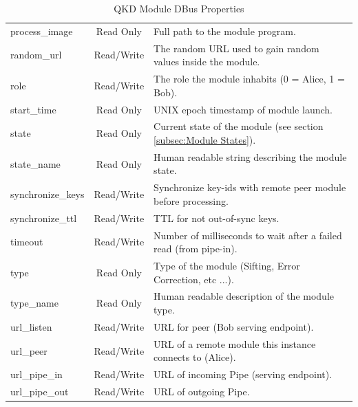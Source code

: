 \begin{table}[h!]
\begin{tabular}{lcp{8cm}}
    process\_image              &   Read Only           &   Full path to the module program.\\
    random\_url                 &   Read/Write          &   The random URL used to gain random values inside the module.\\
    role                        &   Read/Write          &   The role the module inhabits (0 = Alice, 1 = Bob).\\
    start\_time                 &   Read Only           &   UNIX epoch timestamp of module launch.\\
    state                       &   Read Only           &   Current state of the module (see section \ref{subsec:Module States}).\\
    state\_name                 &   Read Only           &   Human readable string describing the module state.\\
    synchronize\_keys           &   Read/Write          &   Synchronize key-ids with remote peer module before processing.\\
    synchronize\_ttl            &   Read/Write          &   TTL for not out-of-sync keys.\\
    timeout                     &   Read/Write          &   Number of milliseconds to wait after a failed read (from pipe-in).\\
    type                        &   Read Only           &   Type of the module (Sifting, Error Correction, etc ...).\\
    type\_name                  &   Read Only           &   Human readable description of the module type.\\
    url\_listen                 &   Read/Write          &   URL for peer (Bob serving endpoint).\\
    url\_peer                   &   Read/Write          &   URL of a remote module this instance connects to (Alice).\\
    url\_pipe\_in               &   Read/Write          &   URL of incoming Pipe (serving endpoint).\\
    url\_pipe\_out              &   Read/Write          &   URL of outgoing Pipe.\\
    \end{tabular}
    \caption{QKD Module DBus Properties}
    \label{tab:QKD Module DBus Properties}
\end{table}

\medskip

